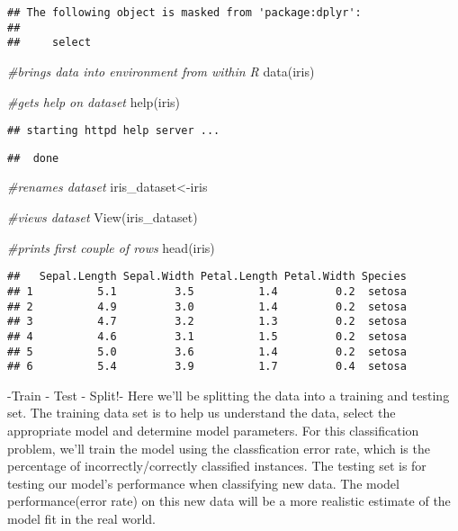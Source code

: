\documentclass[
]{article}
\newenvironment{Shaded}{\begin{snugshade}}{\end{snugshade}}
\newcommand{\CommentTok}[1]{\textcolor[rgb]{0.56,0.35,0.01}{\textit{#1}}}
\newcommand{\FunctionTok}[1]{\textcolor[rgb]{0.00,0.00,0.00}{#1}}
\newcommand{\NormalTok}[1]{#1}
\newcommand{\OtherTok}[1]{\textcolor[rgb]{0.56,0.35,0.01}{#1}}
\begin{document}
\begin{verbatim}
## The following object is masked from 'package:dplyr':
## 
##     select
\end{verbatim}

\begin{Shaded}
\begin{Highlighting}[]
\CommentTok{\#brings data into environment from within R}
\FunctionTok{data}\NormalTok{(iris)}

\CommentTok{\#gets help on dataset}
\FunctionTok{help}\NormalTok{(iris)}
\end{Highlighting}
\end{Shaded}

\begin{verbatim}
## starting httpd help server ...
\end{verbatim}

\begin{verbatim}
##  done
\end{verbatim}

\begin{Shaded}
\begin{Highlighting}[]
\CommentTok{\#renames dataset}
\NormalTok{iris\_dataset}\OtherTok{\textless{}{-}}\NormalTok{iris}

\CommentTok{\#views dataset}
\FunctionTok{View}\NormalTok{(iris\_dataset)}
\end{Highlighting}
\end{Shaded}

\begin{Shaded}
\begin{Highlighting}[]
\CommentTok{\#prints first couple of rows}
\FunctionTok{head}\NormalTok{(iris)}
\end{Highlighting}
\end{Shaded}

\begin{verbatim}
##   Sepal.Length Sepal.Width Petal.Length Petal.Width Species
## 1          5.1         3.5          1.4         0.2  setosa
## 2          4.9         3.0          1.4         0.2  setosa
## 3          4.7         3.2          1.3         0.2  setosa
## 4          4.6         3.1          1.5         0.2  setosa
## 5          5.0         3.6          1.4         0.2  setosa
## 6          5.4         3.9          1.7         0.4  setosa
\end{verbatim}

-Train - Test - Split!- Here we'll be splitting the data into a training
and testing set. The training data set is to help us understand the
data, select the appropriate model and determine model parameters. For
this classification problem, we'll train the model using the
classfication error rate, which is the percentage of
incorrectly/correctly classified instances. The testing set is for
testing our model's performance when classifying new data. The model
performance(error rate) on this new data will be a more realistic
estimate of the model fit in the real world.
\end{document}
